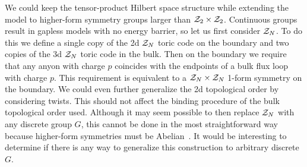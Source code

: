 We could keep the tensor-product Hilbert space structure while extending the model to higher-form symmetry groups larger than $\mathcal{Z}_2\times\mathcal{Z}_2$. Continuous groups result in gapless models with no energy barrier, so let us first consider $\mathcal{Z}_N$. To do this we define a single copy of the 2d $\mathcal{Z}_N$ toric code on the boundary and two copies of the 3d $\mathcal{Z}_N$ toric code in the bulk. Then on the boundary we require that any anyon with charge $p$ coincides with the endpoints of a bulk flux loop with charge $p$. This requirement is equivalent to a $\mathcal{Z}_N\times\mathcal{Z}_N$ 1-form symmetry on the boundary. We could even further generalize the 2d topological order by considering twists. This should not affect the binding procedure of the bulk topological order used. Although it may seem possible to then replace $\mathcal{Z}_N$ with any discrete group $G$, this cannot be done in the most straightforward way because higher-form symmetries must be Abelian~\cite{Gaiotto2015Generalized}. It would be interesting to determine if there is any way to  generalize this construction to arbitrary discrete $G$.
